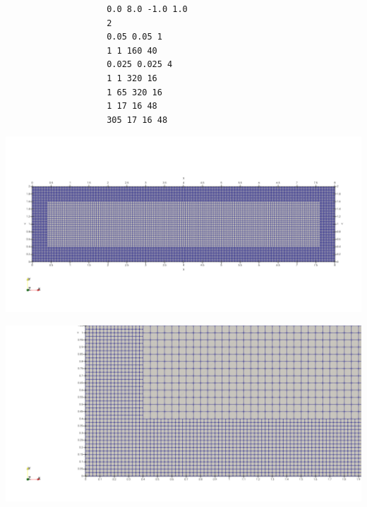 \documentclass[../main/main.tex]{subfiles}
\begin{document}
\begin{frame}[fragile]{}
	\vspace{-1cm}
	\begin{center}
		\begin{minipage}{0.30\textwidth}
			{\footnotesize
				\begin{verbatim}
					0.0 8.0 -1.0 1.0
					2
					0.05 0.05 1
					1 1 160 40
					0.025 0.025 4
					1 1 320 16
					1 65 320 16
					1 17 16 48
					305 17 16 48
				\end{verbatim}
			}
		\end{minipage}
		\hfill
		\begin{minipage}{0.65\textwidth}
			\includegraphics[width=\textwidth]{imgs/ref2.png}
			
			\includegraphics[height=0.3\textheight]{imgs/ref2_border.png}
		\end{minipage}
	\end{center}
\end{frame}
\end{document}
